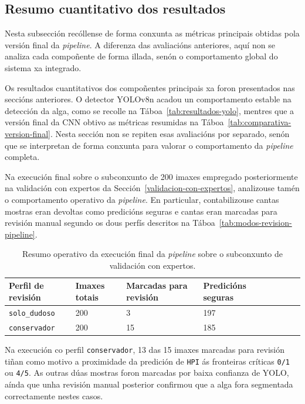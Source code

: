 \subsection{Resumo cuantitativo dos resultados}

Nesta subsección recóllense de forma conxunta as métricas principais obtidas pola versión final da
\textit{pipeline}. A diferenza das avaliacións anteriores, aquí non se analiza cada compoñente de forma
illada, senón o comportamento global do sistema xa integrado.

Os resultados cuantitativos dos compoñentes principais xa foron presentados nas seccións anteriores.
O detector YOLOv8n acadou un comportamento estable na detección da alga, como se recolle na
Táboa~\ref{tab:resultados-yolo}, mentres que a versión final da CNN obtivo as métricas resumidas na
Táboa~\ref{tab:comparativa-version-final}. Nesta sección non se repiten esas avaliacións por separado,
senón que se interpretan de forma conxunta para valorar o comportamento da \textit{pipeline} completa.

Na execución final sobre o subconxunto de 200 imaxes empregado posteriormente na validación con
expertos da Sección~\ref{validacion-con-expertos}, analizouse tamén o comportamento operativo da
\textit{pipeline}. En particular, contabilizouse cantas mostras eran devoltas como predicións seguras
e cantas eran marcadas para revisión manual segundo os dous perfís descritos na
Táboa~\ref{tab:modos-revision-pipeline}.

\begin{table}[htbp]
    \centering
    \begin{tabular}{p{}|p{}|p{}|p{}|p{}|p{}|p{}|p{}}
        \rowcolor{udcpink!25}
        \textbf{Perfil de revisión} & \textbf{Imaxes totais} & \textbf{Marcadas para revisión} & \textbf{Predicións seguras} \\\hline
        \texttt{solo\_dudoso} & 200 & 3 & 197 \\
        \texttt{conservador} & 200 & 15 & 185 \\
    \end{tabular}
    \caption{Resumo operativo da execución final da \textit{pipeline} sobre o subconxunto de validación con expertos.}
    \label{tab:resumo-operativo-pipeline}
\end{table}

Na execución co perfil \texttt{conservador}, 13 das 15 imaxes marcadas para revisión tiñan como motivo
a proximidade da predición de \texttt{HPI} ás fronteiras críticas \texttt{0/1} ou \texttt{4/5}. As
outras dúas mostras foron marcadas por baixa confianza de YOLO, aínda que unha revisión manual
posterior confirmou que a alga fora segmentada correctamente nestes casos.

